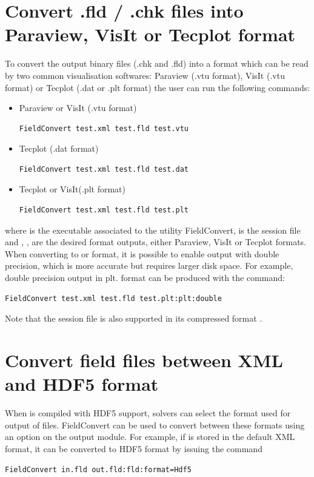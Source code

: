 \section{Convert .fld / .chk files into Paraview, VisIt or Tecplot format}
\label{s:utilities:fieldconvert:sub:convert}
To convert the \nekpp output binary files (.chk and .fld) into a
format which can be read by two common visualisation softwares:
Paraview (.vtu format), VisIt (.vtu format) or Tecplot (.dat or .plt format)
the user can run the following commands:
%
\begin{itemize}
\item Paraview or VisIt (.vtu format)
%
\begin{lstlisting}[style=BashInputStyle]
FieldConvert test.xml test.fld test.vtu
\end{lstlisting}
%
\item Tecplot (.dat format)
%
\begin{lstlisting}[style=BashInputStyle]
FieldConvert test.xml test.fld test.dat
\end{lstlisting}
%
\item Tecplot or VisIt(.plt format)
%
\begin{lstlisting}[style=BashInputStyle]
FieldConvert test.xml test.fld test.plt
\end{lstlisting}
\end{itemize}
%
where  is the executable associated to the utility
FieldConvert,  is the session file and
, ,   are the desired
format outputs, either Paraview, VisIt or Tecplot formats. \\
When converting to  or  format, it is possible to
enable output with double precision, which is more accurate but requires larger
disk space. For example, double precision output in plt. format can be produced
with the command:
\begin{lstlisting}[style=BashInputStyle]
FieldConvert test.xml test.fld test.plt:plt:double
\end{lstlisting}
%
\begin{tipbox}
Note that the session file is also supported
in its compressed format .
\end{tipbox}
%
%
%
\section{Convert field files between XML and HDF5 format}
%
When \nekpp is compiled with HDF5 support, solvers can select the format used
for output of  files. FieldConvert can be used to convert between
these formats using an option on the  output module. For example, if
 is stored in the default XML format, it can be converted to HDF5
format by issuing the command
%
\begin{lstlisting}[style=BashInputStyle]
FieldConvert in.fld out.fld:fld:format=Hdf5
\end{lstlisting}
%

